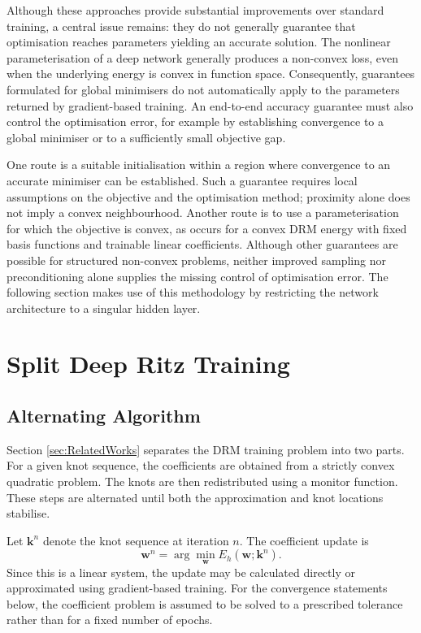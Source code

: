 \documentclass[11pt, onecolumn]{report}
\begin{document}
Although these approaches provide substantial improvements over standard training, a central issue remains: they do not generally guarantee that optimisation reaches parameters yielding an accurate solution. The nonlinear parameterisation of a deep network generally produces a non-convex loss, even when the underlying energy is convex in function space. Consequently, guarantees formulated for global minimisers do not automatically apply to the parameters returned by gradient-based training. An end-to-end accuracy guarantee must also control the optimisation error, for example by establishing convergence to a global minimiser or to a sufficiently small objective gap.

One route is a suitable initialisation within a region where convergence to an accurate minimiser can be established. Such a guarantee requires local assumptions on the objective and the optimisation method; proximity alone does not imply a convex neighbourhood. Another route is to use a parameterisation for which the objective is convex, as occurs for a convex DRM energy with fixed basis functions and trainable linear coefficients. Although other guarantees are possible for structured non-convex problems, neither improved sampling nor preconditioning alone supplies the missing control of optimisation error. The following section makes use of this methodology by restricting the network architecture to a singular hidden layer.


\section{Split Deep Ritz Training}
\subsection{Alternating Algorithm}
Section \ref{sec:RelatedWorks} separates the DRM training problem into two parts. For a given knot sequence, the coefficients are obtained from a strictly convex quadratic problem. The knots are then redistributed using a monitor function. These steps are alternated until both the approximation and knot locations stabilise.

Let \(\mathbf k^n\) denote the knot sequence at iteration \(n\). The coefficient update is
\begin{equation}
    \mathbf w^n
    =
    \arg\min_{\mathbf w}
    E_h(\mathbf w;\mathbf k^n).
    \label{eq:alternating_weight_step}
\end{equation}
Since this is a linear system, the update may be calculated directly or approximated using gradient-based training. For the convergence statements below, the coefficient problem is assumed to be solved to a prescribed tolerance rather than for a fixed number of epochs.
\end{document}
